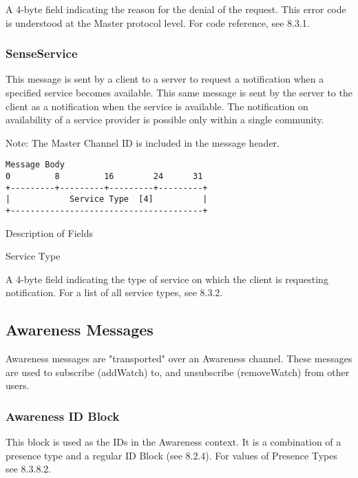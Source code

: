 \documentclass[titlepage,oneside]{book}
\begin{document}
\subpar{}  A 4-byte field indicating the reason for the denial of the
  request. This error code is understood at the Master protocol
  level. For code reference, see 8.3.1.

\subsubsection{SenseService}

\par{} This message is sent by a client to a server to request a notification
when a specified service becomes available. This same message is sent
by the server to the client as a notification when the service is
available. The notification on availability of a service provider is
possible only within a single community.

\par{} Note: The Master Channel ID is included in the message header.

\begin{verbatim}
Message Body
0         8         16        24      31
+---------+---------+---------+---------+
|            Service Type  [4]          |
+---------------------------------------+
\end{verbatim}

\par{} Description of Fields

\par{} Service Type

\subpar{} A 4-byte field indicating the type of service on which the client is 
  requesting notification. For a list of all service types, see 
  8.3.2.

\subsection{Awareness Messages}

\par{} Awareness messages are "transported" over an Awareness channel. These
messages are used to subscribe (addWatch) to, and unsubscribe
(removeWatch) from other users.

\subsubsection{Awareness ID Block}

\par{} This block is used as the IDs in the Awareness context. It is a 
combination of a presence type and a regular ID Block (see 
8.2.4). For values of Presence Types see 
8.3.8.2.
\end{document}

